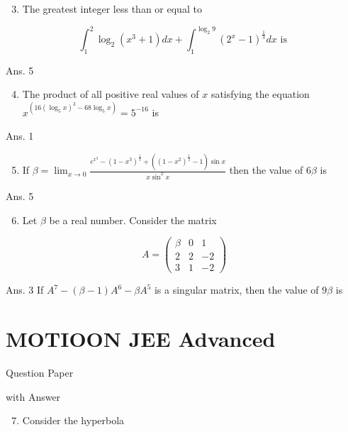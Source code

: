 \documentclass[10pt]{article}
\begin{document}
\begin{enumerate}
  \setcounter{enumi}{2}
  \item The greatest integer less than or equal to
\end{enumerate}

$$
\int_{1}^{2} \log _{2}\left(x^{3}+1\right) d x+\int_{1}^{\log _{2} 9}\left(2^{x}-1\right)^{\frac{1}{3}} d x \text { is }
$$

Ans. 5

\begin{enumerate}
  \setcounter{enumi}{3}
  \item The product of all positive real values of $x$ satisfying the equation $x^{\left(16\left(\log _{5} x\right)^{3}-68 \log _{5} x\right)}=5^{-16}$ is
\end{enumerate}

Ans. 1

\begin{enumerate}
  \setcounter{enumi}{4}
  \item If $\beta=\lim _{x \rightarrow 0} \frac{e^{x^{3}}-\left(1-x^{3}\right)^{\frac{1}{3}}+\left(\left(1-x^{2}\right)^{\frac{1}{2}}-1\right) \sin x}{x \sin ^{2} x}$ then the value of $6 \beta$ is
\end{enumerate}

Ans. 5

\begin{enumerate}
  \setcounter{enumi}{5}
  \item Let $\beta$ be a real number. Consider the matrix
\end{enumerate}

$$
A=\left(\begin{array}{ccc}
\beta & 0 & 1 \\
2 & 2 & -2 \\
3 & 1 & -2
\end{array}\right)
$$

Ans. 3 If $A^{7}-(\beta-1) A^{6}-\beta A^{5}$ is a singular matrix, then the value of $9 \beta$ is

\section{MOTIOON JEE Advanced}
Question Paper

with Answer

\begin{enumerate}
  \setcounter{enumi}{6}
  \item Consider the hyperbola
\end{enumerate}
\end{document}

